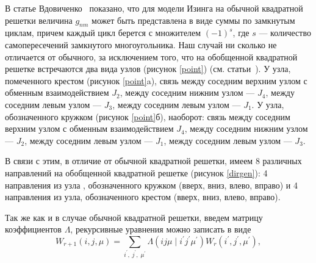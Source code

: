 В статье Вдовиченко~\cite{vdovichenko1965} показано, что для модели Изинга на обычной квадратной решетки величина $g_{nm}$ может быть представлена ​​в виде суммы по замкнутым циклам, причем каждый цикл берется с множителем $(-1)^s$, где $s$ --- количество самопересечений замкнутого многоугольника. Наш случай ни сколько не отличается от обычного, за исключением того, что на обобщенной квадратной решетке встречаются два вида узлов (рисунок \ref{point}) (см. статьи~\cite{vaks1966, chikyu1987}). У узла, помеченного крестом (рисунок \ref{point}a), связь между соседним верхним узлом с обменным взаимодействием $J_2$, между соседним нижним узлом --- $J_4$, между соседним левым узлом --- $J_3$, между соседним левым узлом --- $J_1$. У узла, обозначенного кружком (рисунок \ref{point}б), наоборот: связь между соседним верхним узлом с обменным взаимодействием $J_4$, между соседним нижним узлом --- $J_2$, между соседним левым узлом --- $J_1$, между соседним левым узлом --- $J_3$. 


В связи с этим, в отличие от обычной квадратной решетки, имеем 8 различных направлений на обобщенной квадратной решетке (рисунок \ref{dirgen}): 4 направления из узла , обозначенного кружком (вверх, вниз, влево, вправо) и 4 направления из узла, обозначенного крестом (вверх, вниз, влево, вправо).


Так же как и в случае обычной квадратной решетки, введем матрицу коэффициентов $\Lambda$, рекурсивные уравнения можно записать в виде
\begin{equation}
W_{r+1}(i, j, \mu) = \sum_{i^{'},\; j^{'},\; \mu^{'}} \Lambda (ij\mu\; |\; i^{'}j^{'}\mu^{'}) W_{r} (i^{'}, j^{'}, \mu^{'}),
\end{equation}

